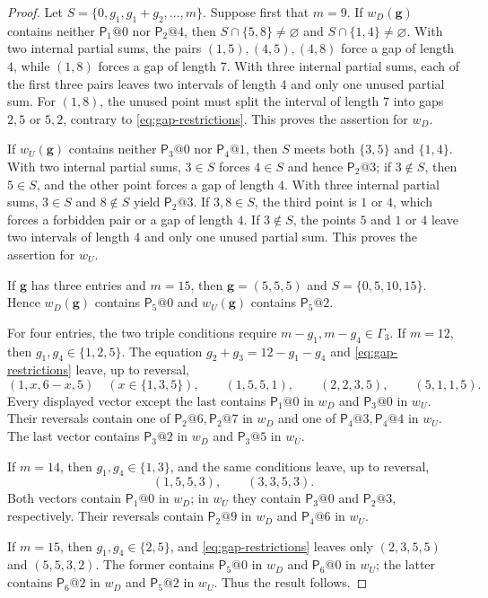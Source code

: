 \documentclass[11pt]{amsart}
\theoremstyle{definition}
\begin{document}
\begin{proof}
Let $S=\{0,g_1,g_1+g_2,\ldots,m\}$. Suppose first that $m=9$. If $w_D(\mathbf g)$ contains neither
$\mathsf P_1@0$ nor $\mathsf P_2@4$, then $S\cap\{5,8\}\ne\varnothing$ and $S\cap\{1,4\}\ne\varnothing$.
With two internal partial sums, the pairs
$(1,5),(4,5),(4,8)$ force a gap of length $4$, while $(1,8)$ forces
a gap of length $7$. With three internal partial sums, each of the
first three pairs leaves two intervals of length $4$ and only one
unused partial sum. For $(1,8)$, the unused point must split the
interval of length $7$ into gaps $2,5$ or $5,2$, contrary to
\eqref{eq:gap-restrictions}. This proves the assertion for $w_D$.

If $w_U(\mathbf g)$ contains neither $\mathsf P_3@0$ nor
$\mathsf P_4@1$, then $S$ meets both $\{3,5\}$ and $\{1,4\}$.
With two internal partial sums, $3\in S$ forces $4\in S$ and hence
$\mathsf P_2@3$; if $3\notin S$, then $5\in S$, and the other point
forces a gap of length $4$. With three internal partial sums,
$3\in S$ and $8\notin S$ yield $\mathsf P_2@3$. If $3,8\in S$, the
third point is $1$ or $4$, which forces a forbidden pair or a gap of
length $4$. If $3\notin S$, the points $5$ and $1$ or $4$ leave two
intervals of length $4$ and only one unused partial sum. This proves
the assertion for $w_U$.

If $\mathbf g$ has three entries and $m=15$, then
$\mathbf g=(5,5,5)$ and $S=\{0,5,10,15\}$. Hence $w_D(\mathbf g)$
contains $\mathsf P_5@0$ and $w_U(\mathbf g)$ contains
$\mathsf P_5@2$.

For four entries, the two triple conditions require $m-g_1,m-g_4\in\Gamma_3$.
If $m=12$, then $g_1,g_4\in\{1,2,5\}$. The equation
$g_2+g_3=12-g_1-g_4$ and \eqref{eq:gap-restrictions} leave, up to
reversal,
\[
(1,x,6-x,5)\quad(x\in\{1,3,5\}),\qquad
(1,5,5,1),\qquad(2,2,3,5),\qquad(5,1,1,5).
\]
Every displayed vector except the last contains $\mathsf P_1@0$ in
$w_D$ and $\mathsf P_3@0$ in $w_U$. Their reversals contain one of
$\mathsf P_2@6,\mathsf P_2@7$ in $w_D$ and one of
$\mathsf P_4@3,\mathsf P_4@4$ in $w_U$. The last vector contains
$\mathsf P_3@2$ in $w_D$ and $\mathsf P_3@5$ in $w_U$.

If $m=14$, then $g_1,g_4\in\{1,3\}$, and the same conditions leave,
up to reversal,
\[
(1,5,5,3),\qquad(3,3,5,3).
\]
Both vectors contain $\mathsf P_1@0$ in $w_D$; in $w_U$ they contain
$\mathsf P_3@0$ and $\mathsf P_2@3$, respectively. Their reversals
contain $\mathsf P_2@9$ in $w_D$ and $\mathsf P_4@6$ in $w_U$.

If $m=15$, then $g_1,g_4\in\{2,5\}$, and
\eqref{eq:gap-restrictions} leaves only $(2,3,5,5)$ and
$(5,5,3,2)$. The former contains $\mathsf P_5@0$ in $w_D$ and
$\mathsf P_6@0$ in $w_U$; the latter contains $\mathsf P_6@2$ in
$w_D$ and $\mathsf P_5@2$ in $w_U$. Thus the result  follows. 
\end{proof}
\end{document}
